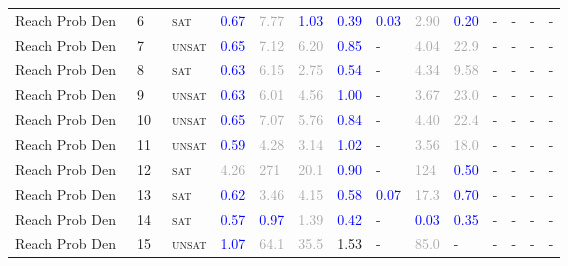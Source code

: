 \begin{center}
{\begin{longtable}{@{}llllllllllllll@{}}
Reach Prob Den~ & 6 & ~\textsc{sat} & \textcolor{blue}{0.67} & \textcolor{darkgray}{7.77} & \textcolor{blue}{1.03} & \textcolor{blue}{0.39} & \textcolor{blue}{0.03} & \textcolor{darkgray}{2.90} & \textcolor{blue}{0.20} & - & - & - & - \\
Reach Prob Den~ & 7 & ~\textsc{unsat} & \textcolor{blue}{0.65} & \textcolor{darkgray}{7.12} & \textcolor{darkgray}{6.20} & \textcolor{blue}{0.85} & - & \textcolor{darkgray}{4.04} & \textcolor{darkgray}{22.9} & - & - & - & - \\
Reach Prob Den~ & 8 & ~\textsc{sat} & \textcolor{blue}{0.63} & \textcolor{darkgray}{6.15} & \textcolor{darkgray}{2.75} & \textcolor{blue}{0.54} & - & \textcolor{darkgray}{4.34} & \textcolor{darkgray}{9.58} & - & - & - & - \\
Reach Prob Den~ & 9 & ~\textsc{unsat} & \textcolor{blue}{0.63} & \textcolor{darkgray}{6.01} & \textcolor{darkgray}{4.56} & \textcolor{blue}{1.00} & - & \textcolor{darkgray}{3.67} & \textcolor{darkgray}{23.0} & - & - & - & - \\
Reach Prob Den~ & 10 & ~\textsc{unsat} & \textcolor{blue}{0.65} & \textcolor{darkgray}{7.07} & \textcolor{darkgray}{5.76} & \textcolor{blue}{0.84} & - & \textcolor{darkgray}{4.40} & \textcolor{darkgray}{22.4} & - & - & - & - \\
Reach Prob Den~ & 11 & ~\textsc{unsat} & \textcolor{blue}{0.59} & \textcolor{darkgray}{4.28} & \textcolor{darkgray}{3.14} & \textcolor{blue}{1.02} & - & \textcolor{darkgray}{3.56} & \textcolor{darkgray}{18.0} & - & - & - & - \\
Reach Prob Den~ & 12 & ~\textsc{sat} & \textcolor{darkgray}{4.26} & \textcolor{darkgray}{271} & \textcolor{darkgray}{20.1} & \textcolor{blue}{0.90} & - & \textcolor{darkgray}{124} & \textcolor{blue}{0.50} & - & - & - & - \\
Reach Prob Den~ & 13 & ~\textsc{sat} & \textcolor{blue}{0.62} & \textcolor{darkgray}{3.46} & \textcolor{darkgray}{4.15} & \textcolor{blue}{0.58} & \textcolor{blue}{0.07} & \textcolor{darkgray}{17.3} & \textcolor{blue}{0.70} & - & - & - & - \\
Reach Prob Den~ & 14 & ~\textsc{sat} & \textcolor{blue}{0.57} & \textcolor{blue}{0.97} & \textcolor{darkgray}{1.39} & \textcolor{blue}{0.42} & - & \textcolor{blue}{0.03} & \textcolor{blue}{0.35} & - & - & - & - \\
Reach Prob Den~ & 15 & ~\textsc{unsat} & \textcolor{blue}{1.07} & \textcolor{darkgray}{64.1} & \textcolor{darkgray}{35.5} & \textcolor{second}{1.53} & - & \textcolor{darkgray}{85.0} & - & - & - & - & - \\

\end{longtable}}
\end{center}

